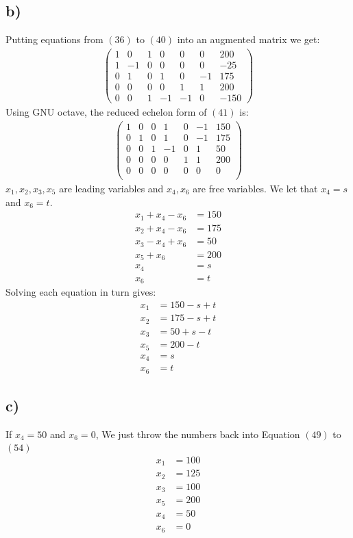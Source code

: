 \documentclass[11pt]{article}
\begin{document}
\subsection{b)}
Putting equations from $(36)$ to $(40)$ into an augmented matrix we get:
\begin{align}
\left(\begin{array}{cccccc|c}
1 & 0 & 1 & 0 & 0 & 0 & 200 \\
1 & -1 & 0 & 0 & 0 & 0 & -25 \\
0 & 1 & 0 & 1 & 0 & -1 & 175 \\
0 & 0 & 0 & 0 & 1 & 1 & 200\\
0 & 0 & 1 & -1 & -1 & 0 & -150
\end{array}\right)
\end{align}
\newpage
Using GNU octave, the reduced echelon form of $(41)$ is:
\begin{align}
\left(\begin{array}{cccccc|c}
     1  &   0  &   0  &   1  &   0  &  -1 &  150 \\
     0  &   1  &   0  &   1  &   0  &  -1 &  175 \\ 
     0  &   0  &   1  &  -1  &   0  &   1 &  50 \\
     0  &   0  &   0  &   0  &   1  &   1 &  200 \\
     0  &   0  &   0  &   0  &   0  &   0 &  0 \\ 
\end{array}\right)
\end{align}
$x_1,x_2,x_3,x_5$ are leading variables and $x_4,x_6$ are free variables.
We let that $x_4 = s$ and $x_6 = t$.
\begin{align}
x_1+x_4-x_6&=150 \\
x_2+x_4-x_6&=175 \\
x_3-x_4+x_6&=50 \\
x_5+x_6&=200 \\
x_4&=s \\
x_6&=t
\end{align}
Solving each equation in turn gives:
\begin{align}
x_1&=150-s+t \\
x_2&=175-s+t \\
x_3&=50+s-t \\
x_5&=200-t \\
x_4&=s \\
x_6&=t
\end{align}
\subsection{c)}
If $x_4=50$ and $x_6 = 0$, We just throw the numbers back into Equation $(49)$ to $(54)$
\begin{align*}
x_1&=100 \\
x_2&=125 \\
x_3&=100 \\
x_5&=200 \\
x_4&=50 \\
x_6&=0
\end{align*}
\end{document}
